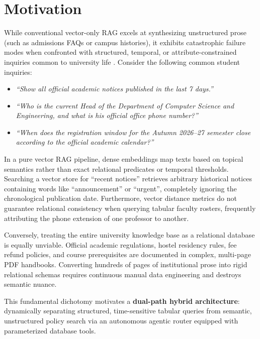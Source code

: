 \documentclass[12pt,a4paper]{report}
\begin{document}
\section{Motivation}
While conventional vector-only RAG excels at synthesizing unstructured prose (such as admissions FAQs or campus histories), it exhibits catastrophic failure modes when confronted with structured, temporal, or attribute-constrained inquiries common to university life \cite{schick2023toolformer}. Consider the following common student inquiries:
\begin{itemize}
    \item \textit{``Show all official academic notices published in the last 7 days.''}
    \item \textit{``Who is the current Head of the Department of Computer Science and Engineering, and what is his official office phone number?''}
    \item \textit{``When does the registration window for the Autumn 2026--27 semester close according to the official academic calendar?''}
\end{itemize}

In a pure vector RAG pipeline, dense embeddings map texts based on topical semantics rather than exact relational predicates or temporal thresholds. Searching a vector store for ``recent notices'' retrieves arbitrary historical notices containing words like ``announcement'' or ``urgent'', completely ignoring the chronological publication date. Furthermore, vector distance metrics do not guarantee relational consistency when querying tabular faculty rosters, frequently attributing the phone extension of one professor to another.

Conversely, treating the entire university knowledge base as a relational database is equally unviable. Official academic regulations, hostel residency rules, fee refund policies, and course prerequisites are documented in complex, multi-page PDF handbooks. Converting hundreds of pages of institutional prose into rigid relational schemas requires continuous manual data engineering and destroys semantic nuance.

This fundamental dichotomy motivates a \textbf{dual-path hybrid architecture}: dynamically separating structured, time-sensitive tabular queries from semantic, unstructured policy search via an autonomous agentic router equipped with parameterized database tools.
\end{document}
